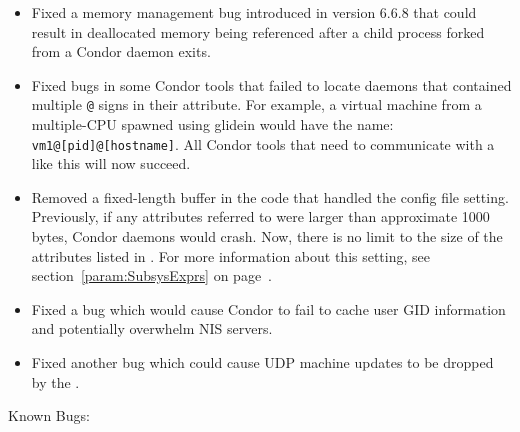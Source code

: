 \begin{itemize}

\item Fixed a memory management bug introduced in version 6.6.8 that
  could result in deallocated memory being referenced after a child
  process forked from a Condor daemon exits.

\item Fixed bugs in some Condor tools that failed to locate
   daemons that contained multiple \verb&@& signs in
  their  attribute.
  For example, a virtual machine from a multiple-CPU 
  spawned using glidein would have the name:
  \verb&vm1@[pid]@[hostname]&.
  All Condor tools that need to communicate with a 
  like this will now succeed.

\item Removed a fixed-length buffer in the code that handled the
   config file setting.
  Previously, if any attributes referred to were larger than
  approximate 1000 bytes, Condor daemons would crash.
  Now, there is no limit to the size of the attributes listed in 
  .
  For more information about this setting, see
  section~\ref{param:SubsysExprs} on page~\pageref{param:SubsysExprs}.

\item Fixed a bug which would cause Condor to fail to cache user GID
information and potentially overwhelm NIS servers.

\item Fixed another bug which could cause UDP machine updates to be
dropped by the .

\end{itemize}

\noindent Known Bugs:

